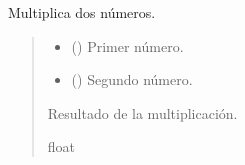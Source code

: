 \documentclass[a4paper,10pt,spanish]{sphinxmanual}
\begin{document}
\begin{fulllineitems}
\label{\detokenize{1_configuracion_inicial/src:src.operaciones.multiplicacion}}
\pysigstartsignatures
\pysiglinewithargsret
{}
{\sphinxparamcomma {}}
{}
\pysigstopsignatures
\sphinxAtStartPar
Multiplica dos números.
\begin{quote}\begin{description}
\begin{itemize}
\item {} 
\sphinxAtStartPar
{} () \textendash{} Primer número.

\item {} 
\sphinxAtStartPar
{} () \textendash{} Segundo número.

\end{itemize}

\sphinxAtStartPar
Resultado de la multiplicación.

\sphinxAtStartPar
float

\end{description}\end{quote}

\end{fulllineitems}

\end{document}
